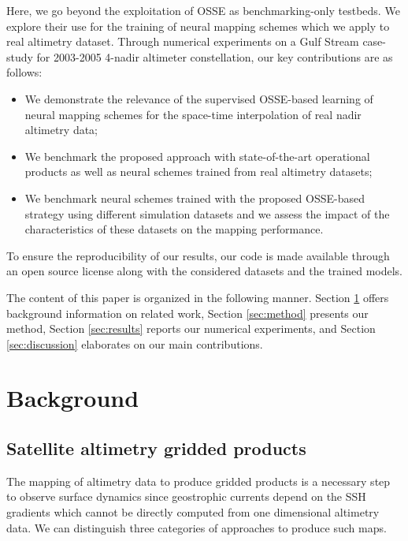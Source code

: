 \begin{bibunit}
Here, we go beyond the exploitation of OSSE as benchmarking-only testbeds. We explore their use for the training of neural mapping schemes which we apply to real altimetry dataset. Through numerical experiments on a Gulf Stream case-study for 2003-2005 4-nadir altimeter constellation, our key contributions are as follows:  

    \begin{itemize}
    \item{We demonstrate the relevance of the supervised OSSE-based learning of neural mapping schemes for the space-time interpolation of real nadir altimetry data;}
    \item{We benchmark the proposed approach with state-of-the-art operational products as well as neural schemes trained from real altimetry datasets;}    
    \item{We benchmark neural schemes trained with the proposed OSSE-based strategy using different simulation datasets and we assess the impact of the characteristics of these datasets on the mapping performance.}
    \end{itemize}
To ensure the reproducibility of our results, our code is made available through an open source license along with the considered datasets and the trained models.

    
The content of this paper is organized in the following manner. Section \ref{sec:background} offers background information on related work, Section \ref{sec:method} presents our method, Section \ref{sec:results} reports our numerical experiments, and Section \ref{sec:discussion} elaborates on our main contributions.



\section{Background}
\label{sec:background}
\subsection{Satellite altimetry gridded products}
\label{ssec:interpolation}
The mapping of altimetry data to produce gridded products is a necessary step to observe surface dynamics since geostrophic currents depend on the SSH gradients which cannot be directly computed from one dimensional altimetry data. We can distinguish three categories of approaches to produce such maps. 


\end{bibunit}
